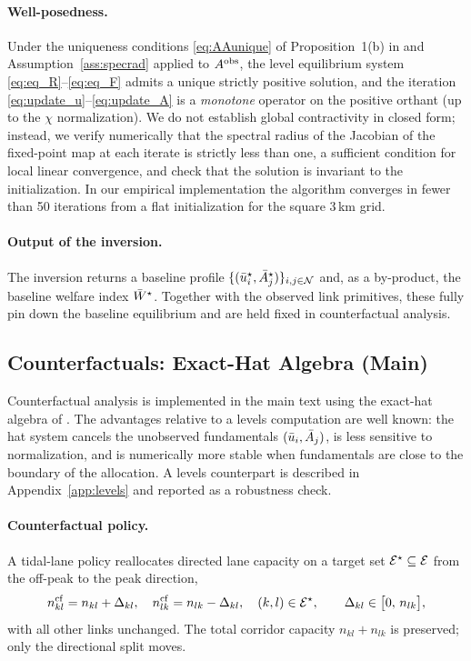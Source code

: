 \paragraph{Well-posedness.}
Under the uniqueness conditions \eqref{eq:AAunique} of
Proposition~1(b) in \cite{AllenArkolakis2022} and
Assumption~\ref{ass:specrad} applied to $A^{\mathrm{obs}}$, the level
equilibrium system \eqref{eq:eq_R}--\eqref{eq:eq_F} admits a unique
strictly positive solution, and the iteration
\eqref{eq:update_u}--\eqref{eq:update_A} is a \emph{monotone}
operator on the positive orthant (up to the $\chi$ normalization).
We do not establish global contractivity in closed form; instead,
we verify numerically that the spectral radius of the Jacobian of
the fixed-point map at each iterate is strictly less than one, a
sufficient condition for local linear convergence, and check that
the solution is invariant to the initialization.  In our empirical
implementation the algorithm converges in fewer than 50 iterations
from a flat initialization for the square 3\,km grid.

\paragraph{Output of the inversion.}
The inversion returns a baseline profile
$\{(\bar u_i^{\star},\bar A_j^{\star})\}_{i,j\in\mathcal N}$ and, as a
by-product, the baseline welfare index $\bar W^{\star}$.  Together
with the observed link primitives, these fully pin down the baseline
equilibrium and are held fixed in counterfactual analysis.

\subsection{Counterfactuals: Exact-Hat Algebra (Main)}\label{ssec:hat}

Counterfactual analysis is implemented in the main text using the
exact-hat algebra of \cite{AllenArkolakis2022}.  The advantages
relative to a levels computation are well known: the hat system
cancels the unobserved fundamentals $(\bar u_i,\bar A_j)$, is less
sensitive to normalization, and is numerically more stable when
fundamentals are close to the boundary of the allocation.  A levels
counterpart is described in Appendix~\ref{app:levels} and reported
as a robustness check.

\paragraph{Counterfactual policy.}
A tidal-lane policy reallocates directed lane capacity on a target
set $\mathcal E^{\star}\subseteq\mathcal E$ from the off-peak to the peak direction,
\begin{equation}\label{eq:cf_lanes}
  n_{kl}^{\mathrm{cf}}=n_{kl}+\Delta_{kl},\quad
  n_{lk}^{\mathrm{cf}}=n_{lk}-\Delta_{kl},\quad
  (k,l)\in\mathcal E^{\star},
  \qquad
  \Delta_{kl}\in\bigl[0,\,n_{lk}\bigr],
\end{equation}
with all other links unchanged.  The total corridor capacity
$n_{kl}+n_{lk}$ is preserved; only the directional split moves.

